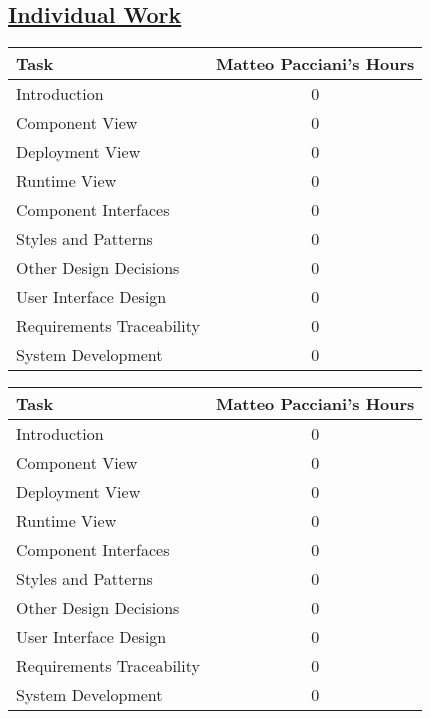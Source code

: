 \subsection[Individual Work]{\hyperlink{toc}{Individual Work}}
\vspace{2mm}
\begin{center}
	\begin{tabular}{| l | c |}
	\hline
	\textbf{Task} & \textbf{Matteo Pacciani's Hours} \\ \hline
	Introduction & 0 \\ \hline
	Component View & 0 \\ \hline
	Deployment View & 0 \\ \hline
	Runtime View & 0 \\ \hline
	Component Interfaces & 0 \\ \hline
	Styles and Patterns & 0 \\ \hline
	Other Design Decisions & 0 \\ \hline
	User Interface Design & 0 \\ \hline
	Requirements Traceability & 0 \\ \hline
	System Development & 0 \\
	\hline	
	\end{tabular}
	
	\vspace{2mm}
	
	\begin{tabular}{| l | c |}
	\hline
	\textbf{Task} & \textbf{Matteo Pacciani's Hours} \\ \hline
	Introduction & 0 \\ \hline
	Component View & 0 \\ \hline
	Deployment View & 0 \\ \hline
	Runtime View & 0 \\ \hline
	Component Interfaces & 0 \\ \hline
	Styles and Patterns & 0 \\ \hline
	Other Design Decisions & 0 \\ \hline
	User Interface Design & 0 \\ \hline
	Requirements Traceability & 0 \\ \hline
	System Development & 0 \\
	\hline
	\end{tabular}
\end{center}